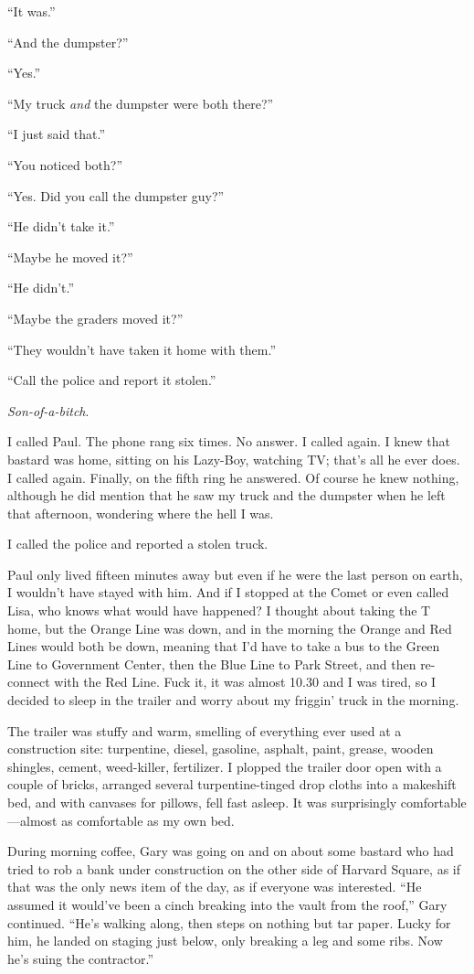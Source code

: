 ``It was.''

``And the dumpster?''

``Yes.''

``My truck \emph{and} the dumpster were both there?''

``I just said that.''

``You noticed both?''

``Yes. Did you call the dumpster guy?''

``He didn't take it.''

``Maybe he moved it?''

``He didn't.''

``Maybe the graders moved it?''

``They wouldn't have taken it home with them.''

``Call the police and report it stolen.''

\emph{Son-of-a-bitch}.

I called Paul. The phone rang six times. No answer. I called again. I
knew that bastard was home, sitting on his Lazy-Boy, watching TV; that's
all he ever does. I called again. Finally, on the fifth ring he
answered. Of course he knew nothing, although he did mention that he saw
my truck and the dumpster when he left that afternoon, wondering where
the hell I was.

I called the police and reported a stolen truck.

Paul only lived fifteen minutes away but even if he were the last person
on earth, I wouldn't have stayed with him. And if I stopped at the Comet
or even called Lisa, who knows what would have happened? I thought about
taking the T home, but the Orange Line was down, and in the morning the
Orange and Red Lines would both be down, meaning that I'd have to take a
bus to the Green Line to Government Center, then the Blue Line to Park
Street, and then re-connect with the Red Line. Fuck it, it was almost
10.30 and I was tired, so I decided to sleep in the trailer and worry
about my friggin' truck in the morning.

The trailer was stuffy and warm, smelling of everything ever used at a
construction site: turpentine, diesel, gasoline, asphalt, paint, grease,
wooden shingles, cement, weed-killer, fertilizer. I plopped the trailer
door open with a couple of bricks, arranged several turpentine-tinged
drop cloths into a makeshift bed, and with canvases for pillows, fell
fast asleep. It was surprisingly comfortable---almost as comfortable as
my own bed.

During morning coffee, Gary was going on and on about some bastard who
had tried to rob a bank under construction on the other side of Harvard
Square, as if that was the only news item of the day, as if everyone was
interested. ``He assumed it would've been a cinch breaking into the
vault from the roof,'' Gary continued. ``He's walking along, then steps
on nothing but tar paper. Lucky for him, he landed on staging just
below, only breaking a leg and some ribs. Now he's suing the
contractor.''

